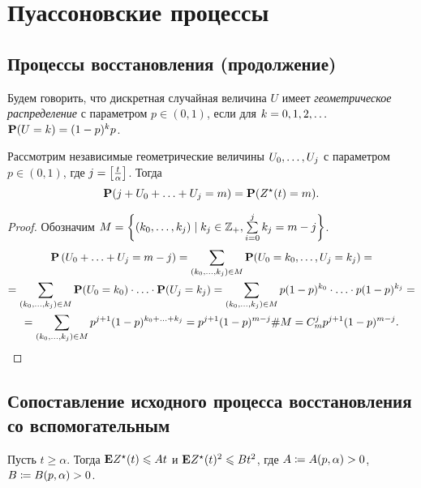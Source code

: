 \chapter{Пуассоновские процессы}

\section{Процессы восстановления (продолжение)}

\begin{df}
	Будем говорить, что дискретная случайная величина $U$ имеет
	\textit{геометрическое распределение} с параметром $p \in (0, 1)$,
	если для $k = 0, 1, 2,\ldots$ $\mathbf{P}(U = k) = (1 - p)^k p$.
\end{df}

\begin{lemma}\label{lemsum}
	Рассмотрим независимые геометрические величины $U_0 ,\ldots, U_j$ с параметром $p \in (0, 1)$,
	где $j = \left[\frac t \alpha\right]$.
Тогда
	$$
		\Pb (j + U_0 \spl U_j = m)
	=	\Pb (Z^{\star}(t) = m ).
	$$
\end{lemma}

\begin{proof}
	 Обозначим $M = \left\{ (k_0,\ldots, k_j)\mid k_j \in \mathbb{Z}_+, \sum\limits_{i = 0}^j k_j = m - j\right\}$.
	\begin{multline*}
		\Pb\hr{ U_0 \spl U_j = m - j}
	=	\sum_{(k_0 \sco k_j) \in M} \Pb(U_0 = k_0 \sco U_j = k_j) = \\
	=	\sum_{(k_0 \sco k_j) \in M} \Pb(U_0 = k_0) \sd \Pb(U_j = k_j)
	=	\sum_{(k_0 \sco k_j) \in M} p (1 - p)^{k_0} \sd p (1 - p)^{k_j} = \\
	=	\sum_{(k_0 \sco k_j) \in M} p^{j + 1} (1 - p)^{k_0 \spl k_j}
	=	p^{j + 1} (1 - p)^{m - j} \#M = C_m^j p^{j + 1} (1 - p)^{m - j}.
	\end{multline*}
\end{proof}

\section{Сопоставление исходного процесса восстановления со вспомогательным}

\begin{lemma}\label{est}
	Пусть $t \ge \alpha$.
	Тогда $\mathbf{E} Z^\star(t) \leqslant At$ и $\mathbf{E} Z^\star(t)^2 \leqslant B t^2$,
	где $A \coloneqq A(p, \alpha) > 0$, $B \coloneqq B(p, \alpha) > 0$.
\end{lemma}

